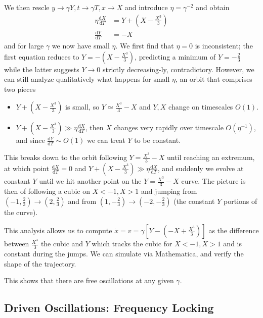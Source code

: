 \documentclass[10pt]{article}
\newcommand{\rd}[2]{\frac{\mathrm{d}#1}{\mathrm{d}#2}}
\begin{document}
We then rescle $y \to \gamma Y, t \to \gamma T, x \to X$ and introduce $\eta =
\gamma^{-2}$ and obtain
\begin{align}
    \eta \rd{X}{T} &= Y + \left( X - \frac{X^3}{3} \right)\\
    \rd{Y}{T} &= -X
\end{align}
and for large $\gamma$ we now have small $\eta$. We first find that $\eta = 0$
is inconsistent; the first equation reduces to $Y = -\left( X - \frac{X^3}{3}
\right)$, predicting a minimum of $Y = -\frac{2}{3}$ while the latter suggests
$Y \to 0$ strictly decreasing-ly, contradictory. However, we can still analyze
qualitatively what happens for small $\eta$, an orbit that comprises two pieces
\begin{itemize}
    \item $Y + \left( X - \frac{X^3}{3} \right)$ is small, so $Y \simeq
        \frac{X^3}{3} - X$ and $Y, X$ change on timescales $O(1)$.
    \item $Y + \left( X - \frac{X^3}{3} \right) \gg \eta\rd{X}{T}$, then $X$
        changes very rapidly over timescale $O(\eta^{-1})$, and since $\rd{Y}{T}
        \sim O(1)$ we can treat $Y$ to be constant.
\end{itemize}

This breaks down to the orbit following $Y = \frac{X^3}{3} - X$ until reaching
an extremum, at which point $\rd{X}{T} = 0$ and $Y + \left( X - \frac{X^3}{3}
\right) \gg \eta \rd{X}{T}$, and suddenly we evolve at constant $Y$ until we hit
another point on the $Y = \frac{X^3}{3} - X$ curve. The picture is then of
following a cubic on $X < -1, X > 1$ and jumping from $\left(-1,
\frac{2}{3}\right) \to \left( 2, \frac{2}{3} \right)$ and from $\left( 1,
-\frac{2}{3} \right)\to \left( -2, -\frac{2}{3} \right)$ (the constant $Y$
portions of the curve).

This analysis allows us to compute $\dot{x} = v = \gamma\left[ Y - \left( -X +
\frac{X^3}{3} \right) \right]$ as the difference between $\frac{X^3}{3}$ the
cubic and $Y$ which tracks the cubic for $X < -1, X > 1$ and is constant during
the jumps. We can simulate via Mathematica, and verify the shape of the
trajectory.

This shows that there are free oscillations at any given $\gamma$.

\subsection{Driven Oscillations: Frequency Locking}
\end{document}
